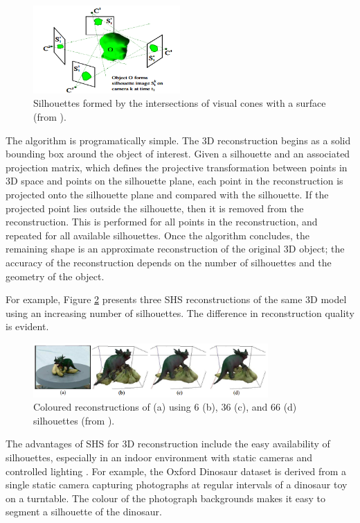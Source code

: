 \begin{figure}[ht]
  \centering
  \includegraphics[width=0.5\textwidth]{images/q2_shape_from_silhouette.png}
  \caption{Silhouettes formed by the intersections of visual cones with a surface (from \cite{cheung_2005}).}
  \label{fig:silhouettes}
\end{figure}

The algorithm is programatically simple. The 3D reconstruction begins as a solid bounding box around the object of interest. Given a silhouette and an associated projection matrix, which defines the projective transformation between points in 3D space and points on the silhouette plane, each point in the reconstruction is projected onto the silhouette plane and compared with the silhouette. If the projected point lies outside the silhouette, then it is removed from the reconstruction. This is performed for all points in the reconstruction, and repeated for all available silhouettes. Once the algorithm concludes, the remaining shape is an approximate reconstruction of the original 3D object; the accuracy of the reconstruction depends on the number of silhouettes and the geometry of the object.

For example, Figure \ref{fig:shs_example} presents three SHS reconstructions of the same 3D model using an increasing number of silhouettes. The difference in reconstruction quality is evident.

\begin{figure}[ht]
  \centering
  \includegraphics[width=0.8\textwidth]{images/q2_shape_from_silhouette_example.png}
  \caption{Coloured reconstructions of (a) using 6 (b), 36 (c), and 66 (d) silhouettes (from \cite{cheung_2005}).}
  \label{fig:shs_example}
\end{figure}

The advantages of SHS for 3D reconstruction include the easy availability of silhouettes, especially in an indoor environment with static cameras and controlled lighting \cite{cheung_2005}. For example, the Oxford Dinosaur dataset is derived from a single static camera capturing photographs at regular intervals of a dinosaur toy on a turntable. The colour of the photograph backgrounds makes it easy to segment a silhouette of the dinosaur.

